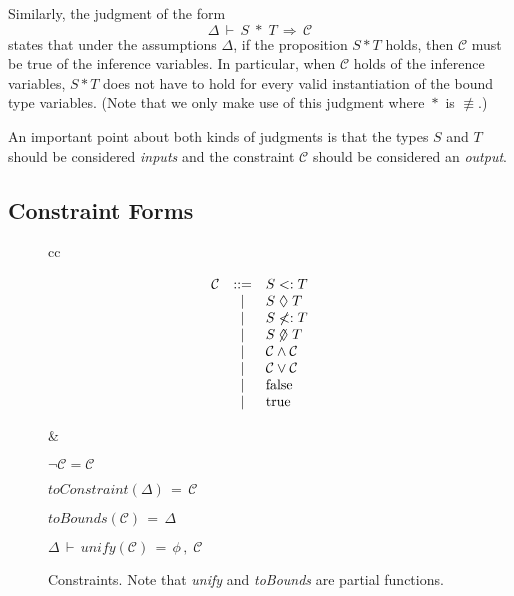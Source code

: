 \documentclass[10pt]{sigplanconf}
\newcommand{\C}{\mathcal{C}}
\newcommand{\exc}{\mathrel{\lozenge}}
\newcommand{\nexc}{\mathrel{\hbox to 0pt{$\mskip -1.4mu\not$\hss}\lozenge}}
\newcommand{\propop}{\ensuremath{\mathrel{\ast}}}
\newcommand{\FALSE}{\textrm{false}}
\newcommand{\TRUE}{\textrm{true}}
\newcommand{\jgcontratemplate}[5][\Delta]{\ensuremath{{#1}\,\vdash\,{#2}\;{#3}\;{#4}\,\Rightarrow\,{#5}}}
\newcommand{\toConstraint}[2]{\ensuremath{\textit{toConstraint}({#1})\,=\,{#2}}}
\newcommand{\toBounds}[2]{\ensuremath{\textit{toBounds}({#1})\,=\,{#2}}}
\newcommand{\jsolve}[4][\Delta]{\ensuremath{{#1}\,\vdash\,\textit{unify}({#2})\,=\,{#3}\,,\;{#4}}}
\begin{document}
Similarly, the judgment of the form
\[\jgcontratemplate{S}{\propop}{T}{\C}\]
states that under the assumptions $\Delta$, if the proposition $S \propop T$ holds, then $\C$ must be true of the inference variables. 
In particular, 
when $\C$ holds of the inference variables, 
$S \propop T$ does not have to hold 
for every valid instantiation of the bound type variables. 
(Note that we only make use of this judgment where $\propop$ is $\not\equiv$.)

An important point about both kinds of judgments is that the types $S$ and $T$ should be considered \emph{inputs} and the
constraint $\C$ should be considered an \emph{output}.

\subsection{Constraint Forms}
\begin{figure}[tb]


\begin{tabular}{cc}
\begin{minipage}{.2\textwidth}
\centering
  \[
  \begin{array}{lcl}
  \C &::=& S <: T \\
  &\mid& S \exc T \\
  &\mid& S \not<: T \\
  &\mid& S \nexc T \\
  &\mid& \C \wedge \C \\
  &\mid& \C \vee \C \\
  &\mid& \FALSE \\
  &\mid& \TRUE \\
  \end{array}
  \]
\end{minipage}
&
\begin{minipage}{.25\textwidth}
\centering

  \vspace{\afterruleskip}
  $\neg \C = \C$
  \vspace{\afterruleskip}

  \toConstraint{\Delta}{\C} \\
  \vspace{\afterruleskip}

  \toBounds{\C}{\Delta} \\
  \vspace{\afterruleskip}

  \jsolve{\C}{\phi}{\C} \\
  \vspace{\afterruleskip}
\end{minipage}
\end{tabular}


  \caption{Constraints. Note that \textit{unify} and \textit{toBounds} are partial functions.}
  \label{fig:constraints}
\end{figure}
\end{document}
